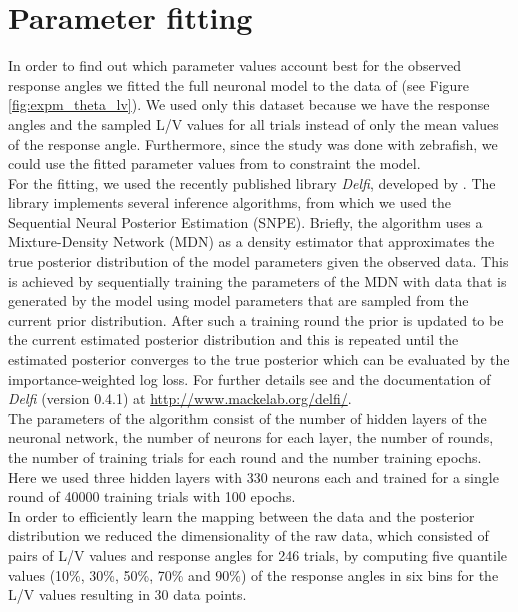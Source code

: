 \documentclass[a4paper,10pt,hidelinks]{scrreprt}
\begin{document}
    \section{Parameter fitting}
    In order to find out which parameter values account best for the observed response angles we fitted the full neuronal model to the data of \cite{Bhattacharyya2017} (see Figure \ref{fig:expm_theta_lv}).
    We used only this dataset because we have the response angles and the sampled L/V values for all trials instead of only the mean values of the response angle.
    Furthermore, since the study was done with zebrafish, we could use the fitted parameter values from \cite{Koyama2016} to constraint the model.\\
    For the fitting, we used the recently published library \textit{Delfi}, developed by \cite{Lueckmann2018}.
    The library implements several inference algorithms, from which we used the Sequential Neural Posterior Estimation (SNPE).
    Briefly, the algorithm uses a Mixture-Density Network (MDN) as a density estimator that approximates the true posterior distribution of the model parameters given the observed data.
    This is achieved by sequentially training the parameters of the MDN with data that is generated by the model using model parameters that are sampled from the current prior distribution.
    After such a training round the prior is updated to be the current estimated posterior distribution and this is repeated until the estimated posterior converges to the true posterior which can be evaluated by the importance-weighted log loss.
    For further details see \cite{Lueckmann2018} and the documentation of \textit{Delfi} (version 0.4.1) at \href{http://www.mackelab.org/delfi/}{http://www.mackelab.org/delfi/}.\\
    The parameters of the algorithm consist of the number of hidden layers of the neuronal network, the number of neurons for each layer, the number of rounds, the number of training trials for each round and the number training epochs.
    Here we used three hidden layers with 330 neurons each and trained for a single round of 40000 training trials with 100 epochs.\\
    In order to efficiently learn the mapping between the data and the posterior distribution we reduced the dimensionality of the raw data, which consisted of pairs of L/V values and response angles for 246 trials, by computing five quantile values (10\%, 30\%, 50\%, 70\% and 90\%) of the response angles in six bins for the L/V values resulting in 30 data points.
\end{document}
